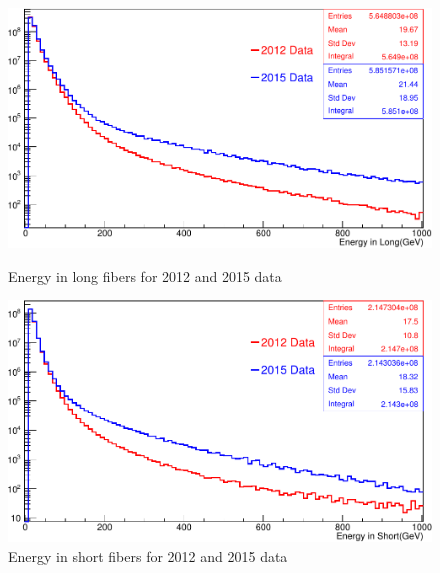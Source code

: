 \begin{itemize}
\begin{figure}[ht]
\begin{minipage}[b]{0.5\linewidth}
\centering
\includegraphics[width=\linewidth]{../Figures/Chap2/ImageFiles_HF/2012vs2015/Elong1DCompare.pdf}
\captionsetup{width=.9\linewidth}
\caption[\elong for 2012 and 2015 data]{Energy in long fibers for 2012 and 2015 data}
\label{2012vs2015E1}
\end{minipage}
\hspace{0.5cm}
\begin{minipage}[b]{0.5\linewidth}
\centering
\includegraphics[width=\linewidth]{../Figures/Chap2/ImageFiles_HF/2012vs2015/Eshort1DCompare.pdf}
\captionsetup{width=.9\linewidth}
\caption[\eshort for 2012 and 2015 data]{Energy in short fibers for 2012 and 2015 data}
\label{2012vs2015E2}
\end{minipage}
\end{figure}
\end{itemize}


